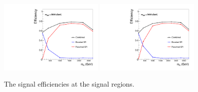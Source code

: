 \begin{figure}[htbp]
  \includegraphics[width=0.45\textwidth]{figures/SigEff/WR2800.pdf}
  \hspace{0.01\textwidth}
  \includegraphics[width=0.45\textwidth]{figures/SigEff/WR3400.pdf}

  \caption{
    The signal efficiencies at the signal regions.
  }
  \label{fig:SigEff1}
\end{figure}

